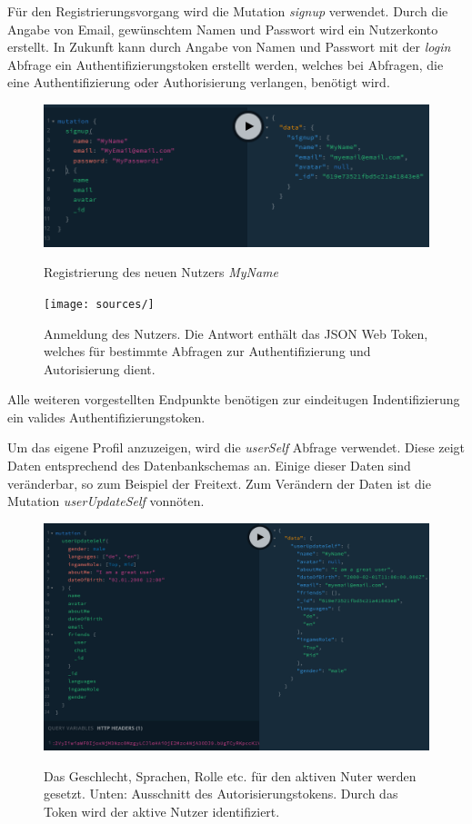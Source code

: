 Für den Registrierungsvorgang wird die Mutation \textit{signup} verwendet. Durch die Angabe von Email, gewünschtem Namen und Passwort wird ein Nutzerkonto erstellt. In Zukunft kann durch Angabe von Namen und Passwort mit der \textit{login} Abfrage ein Authentifizierungstoken erstellt werden, welches bei Abfragen, die eine Authentifizierung oder Authorisierung verlangen, benötigt wird.

\begin{figure}
	\centering
    \includegraphics[width=\textwidth]{sources/graphiql_signup.png}\cite{}
	\caption{Registrierung des neuen Nutzers \textit{MyName}}
	\label{fig2}

\end{figure}\begin{figure}
	\centering
    \texttt{[image: sources/]}\cite{}
	\caption{Anmeldung des Nutzers. Die Antwort enthält das JSON Web Token, welches für bestimmte Abfragen zur Authentifizierung und Autorisierung dient.}
	\label{fig3}
\end{figure}

Alle weiteren vorgestellten Endpunkte benötigen zur eindeitugen Indentifizierung ein valides Authentifizierungstoken.

Um das eigene Profil anzuzeigen, wird die \textit{userSelf} Abfrage verwendet. Diese zeigt Daten entsprechend des Datenbankschemas an. Einige dieser Daten sind veränderbar, so zum Beispiel der Freitext. Zum Verändern der Daten ist die Mutation \textit{userUpdateSelf} vonnöten.

\begin{figure}
	\centering
    \includegraphics[width=\textwidth]{sources/graphiql_userUpdateSelf.png}\cite{}
	\caption{Das Geschlecht, Sprachen, Rolle etc. für den aktiven Nuter werden gesetzt. Unten: Ausschnitt des Autorisierungstokens. Durch das Token wird der aktive Nutzer identifiziert.}
	\label{fig4}
\end{figure}

